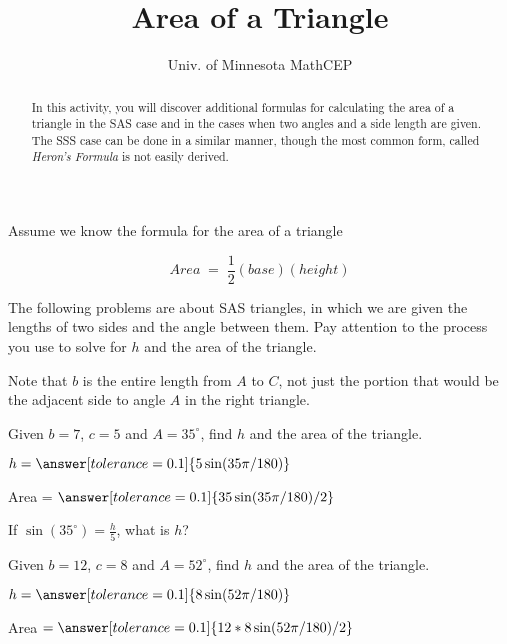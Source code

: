 \documentclass[number]{ximera}
\title{Area of a Triangle}
\author{Univ. of Minnesota MathCEP}
\begin{document}
\begin{abstract}
  In this activity, you will discover additional formulas for calculating the area of a triangle in the SAS case and in the cases when two angles and a side length are given. 
The SSS case can be done in a similar manner, though the most common form, called {\it{Heron's Formula}} is not easily derived.
\end{abstract}

\maketitle

Assume we know the formula for the area of a triangle

$$Area \; = \; \frac{1}{2}(base)(height)$$


The following problems are about SAS triangles, in which we are given the lengths of two sides and the angle between them.
Pay attention to the process you use to solve for $h$ and the area of the triangle.

Note that $b$ is the entire length from $A$ to $C$, not just the portion that would be the adjacent side to angle $A$ in the right triangle.

\begin{problem}
Given $b = 7$, $c=5$ and $A = 35^\circ$, find $h$ and the area of the triangle.
\begin{image}
\end{image}
$h=\answer[tolerance=0.1]{5\sin(35\pi/180)}$

Area = $\answer[tolerance=0.1]{35\sin(35\pi/180)/2}$ %

\begin{hint}
If $\sin(35^\circ)=\frac{h}{5}$, what is $h$?
\end{hint}
\end{problem}

\begin{problem}
Given $b = 12$, $c=8$ and $A = 52^\circ$, find $h$ and the area of the triangle.

$h=\answer[tolerance=0.1]{8\sin(52\pi/180)}$

Area $=\answer[tolerance=0.1]{12*8\sin(52\pi/180)/2}$
\end{problem}
\end{document}
